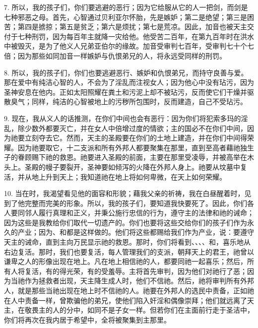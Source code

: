7. 所以，我的孩子们，你们要逃避的恶行；因为它给服从它的人一把剑，而剑是七种邪恶之母。首先，心智通过贝利亚尔怀胎，先是嫉妒；第二是绝望；第三是困苦；第四是掳掠；第五是贫乏；第六是烦扰；第七是荒凉。因此，加音也被天主交付于七种刑罚，因为每百年主就降一灾给他。他受苦二百年，在第九百年时在洪水中被毁灭，是为了他义人兄弟亚伯尔的缘故。加音受审判七百年，受审判七十个七倍；因为那些如同加音一样嫉妒与仇恨弟兄的人，将永远受同样的刑罚。\par

8. 所以，我的孩子们，你们也要逃避恶行、嫉妒和仇恨弟兄，而持守良善与爱。那在爱中有纯洁心智的人，不会为了淫乱而注视女人；因为他心中没有玷污，因为圣神安息在他内。正如太阳照耀在粪土和污泥上却不被玷污，反而使它们干燥并驱散臭气；同样，纯洁的心智被地上的污秽所包围时，反而建造，自己不受玷污。\par

9. 现在，我从义人的话推测，在你们中间也会有恶行：因为你们将犯索多玛的淫乱，除少数外都要灭亡，并在女人中倍增过度的情欲；主的国必不在你们中间，因为祂要立刻夺去它。然而，天主的圣殿要在你们的土地上建造，并在你们中间得荣耀。因为祂要取它，十二支派和所有外邦人都要聚集在那里，直到至高者藉祂独生子的眷顾赐下祂的救恩。祂要进入圣殿的前面，主要在那里受凌辱，并被高举在木头上。圣殿的幔子要裂开，圣神要如倾泻的火降在外邦人身上。祂要从坟墓中复活，并从地上升到天上；我知道祂在地上将如何卑微，在天上如何荣耀。\par

10. 当在时，我渴望看见他的面容和形貌；藉我父亲的祈祷，我在白昼醒着时，见到了他完整而完美的形象。所以，我的孩子们，要知道我快要死了。因此，你们各人要同邻人履行真理和正义，并秉公施行忠信的行为，遵守主的法律和祂的诫命；因为这些是我教给你们取代一切遗产的。你们也要将这些交给你们的孩子们作为永久的产业；因为、和都是这样做的。他们将这些都赐给我们作为产业，说：要遵守天主的诫命，直到主向万民显示祂的救恩。那时，你们将看到、、、、和，喜乐地从右边复活。那时，我们也要复活，每人管理我们的支派，朝拜天上的君王，祂曾以谦卑之人的形像出现在地上。凡在地上相信祂的人，都要同祂一起喜乐；然后，所有人将复活，有的得光荣，有的受羞辱。主将首先审判，因为他们对祂行了恶；因为当祂作为拯救者出现，天主降生成人时，他们不信祂。然后，祂将审判所有外邦人，就是那些当祂出现在地上时不信祂的人。祂要在外邦人的选民中责备，正如祂在人中责备一样，曾欺骗他的弟兄，使他们陷入奸淫和偶像崇拜；他们就远离了天主，在敬畏主的人的分中，如同不是子女一样。但若你们在主面前行走于圣洁中，你们将再次在我内居于希望中，全将被聚集到主那里。\par

